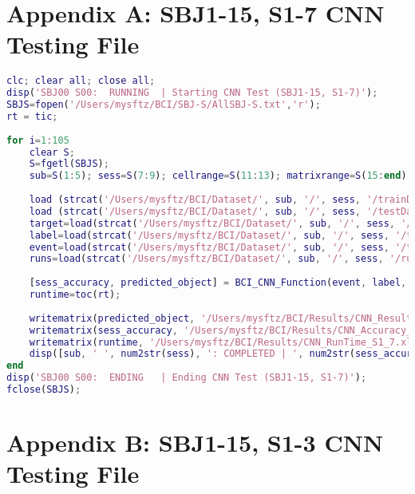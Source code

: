 \newpage
\section*{Appendix A: SBJ1-15, S1-7 CNN Testing File}
\label{Appendix A: SBJ1-15, S1-7 CNN Testing File Section}

\begin{lstlisting}[language=matlab]
clc; clear all; close all; 
disp('SBJ00 S00:  RUNNING  | Starting CNN Test (SBJ1-15, S1-7)');
SBJS=fopen('/Users/mysftz/BCI/SBJ-S/AllSBJ-S.txt','r');
rt = tic; 
    
for i=1:105 
    clear S;
    S=fgetl(SBJS);         
    sub=S(1:5); sess=S(7:9); cellrange=S(11:13); matrixrange=S(15:end);
    
    load (strcat('/Users/mysftz/BCI/Dataset/', sub, '/', sess, '/trainData.mat'));
    load (strcat('/Users/mysftz/BCI/Dataset/', sub, '/', sess, '/testData.mat'));
    target=load(strcat('/Users/mysftz/BCI/Dataset/', sub, '/', sess, '/trainTargets.txt')); 
    label=load(strcat('/Users/mysftz/BCI/Dataset/', sub, '/', sess, '/testLabels.txt')); 
    event=load(strcat('/Users/mysftz/BCI/Dataset/', sub, '/', sess, '/testEvents.txt')); 
    runs=load(strcat('/Users/mysftz/BCI/Dataset/', sub, '/', sess, '/runs_per_block.txt'));
    
    [sess_accuracy, predicted_object] = BCI_CNN_Function(event, label, runs, sess, sub, target, testData, trainData);
    runtime=toc(rt); 
    
    writematrix(predicted_object, '/Users/mysftz/BCI/Results/CNN_Results_S1_7.xlsx', 'Range', matrixrange); 
    writematrix(sess_accuracy, '/Users/mysftz/BCI/Results/CNN_Accuracy_S1_7.xlsx', 'Range', cellrange); 
    writematrix(runtime, '/Users/mysftz/BCI/Results/CNN_RunTime_S1_7.xlsx', 'Range', cellrange); 
    disp([sub, ' ', num2str(sess), ': COMPLETED | ', num2str(sess_accuracy), '% Accuracy in ', num2str(runtime), 's']);
end
disp('SBJ00 S00:  ENDING   | Ending CNN Test (SBJ1-15, S1-7)'); 
fclose(SBJS); 
\end{lstlisting}

\newpage
\section*{Appendix B: SBJ1-15, S1-3 CNN Testing File}
\label{Appendix B: SBJ1-15, S1-3 CNN Testing File Section}

